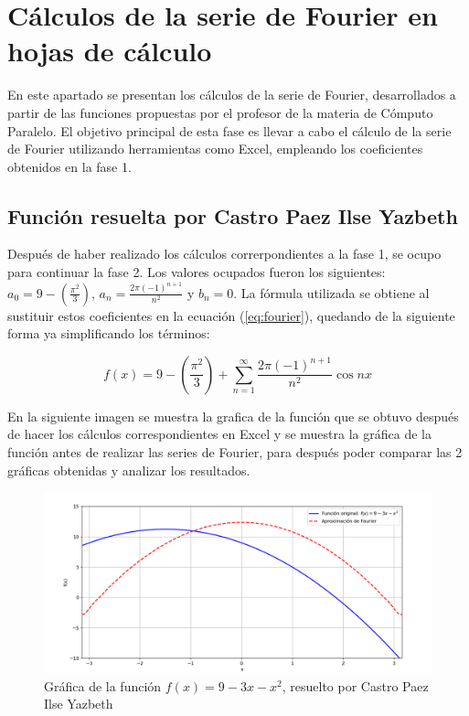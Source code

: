 \chapter[Cálculos de la serie de Fourier en hojas de cálculo]{Cálculos de la serie de Fourier en hojas de cálculo}
\label{cp:user-guide}

{
\parindent0pt

En este apartado se presentan los cálculos de la serie de Fourier, desarrollados a partir de las funciones propuestas por el profesor de la materia de Cómputo Paralelo. El objetivo principal de esta fase es llevar a cabo el cálculo de la serie de Fourier utilizando herramientas como Excel, empleando los coeficientes obtenidos en la fase 1.
\vspace{10pt}

\newpage
\section{Función resuelta por Castro Paez Ilse Yazbeth}
\label{sec:class-options}
Después de haber realizado los cálculos correrpondientes a la fase 1, se ocupo para continuar la fase 2. Los valores ocupados fueron los siguientes: \(a_0 = 9 - \left(\frac{\pi^2}{3}\right)\), \(a_n =\frac{2\pi (-1)^{n+1}}{n^2}\) y \(b_n = 0\).
La fórmula utilizada se obtiene al sustituir estos coeficientes en la ecuación (\ref{eq:fourier}), quedando de la siguiente forma ya simplificando los términos: 

\begin{equation}
\label{eq:serieFourier-Ilse-simplified}
f(x) = 9 - \left(\frac{\pi^2}{3}\right) + \sum_{n=1}^{\infty} \frac{2\pi (-1)^{n+1}}{n^2} \cos{nx}
\end{equation}
\vspace{10pt}

En la siguiente imagen se muestra la grafica de la función que se obtuvo después de hacer los cálculos correspondientes en Excel y se muestra la gráfica de la función antes de realizar las series de Fourier, para después poder comparar las 2 gráficas obtenidas y analizar los resultados. 


\begin{figure}[H]
    \centering
    \includegraphics[width=\linewidth]{Figures/fourierIlse/Grafica-Ilse.png}
    \caption[Gráfica de la función \(f(x)=9-3x-x^2\)]{Gráfica de la función  \(f(x)=9-3x-x^2\), resuelto por Castro Paez Ilse Yazbeth}
    \label{fig:figure-ilse-01}
\end{figure}

}
